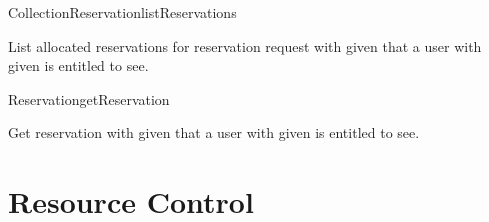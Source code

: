 \begin{Api}
\begin{ApiCmdCollection}{Collection}{Reservation}{listReservations}%
%
%
\end{ApiCmdCollection}
List allocated reservations for reservation request with given  that a user with given  is entitled to see.

\begin{ApiCmd}{Reservation}{getReservation}%
%
%
\end{ApiCmd}
Get reservation with given  that a user with given  is entitled to see.

\end{Api}

\section{Resource Control}

\todo{}



